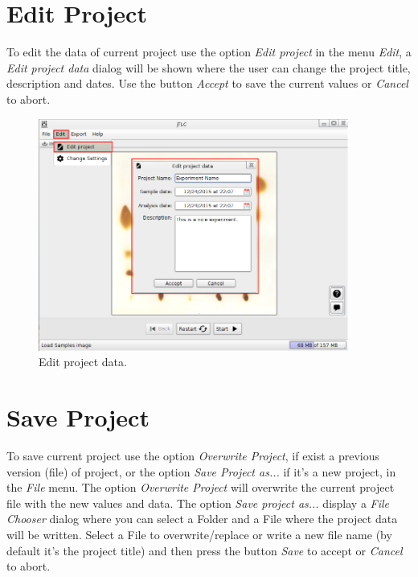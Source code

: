 \section{Edit Project}
To edit the data of current project use the option \emph{Edit project} in the menu \emph{Edit}, a \emph{Edit project data} dialog will be shown where the user can change the project title, description and dates. Use the button \emph{Accept} to save the current values or \emph{Cancel} to abort.
\begin{figure}[H]
	\vspace{0cm}
	\centering
	\includegraphics[width=385px]{imagenes/edit_project}
	\centering
	\vspace{-0.4cm}
	\caption{Edit project data.}
	\label{fig:edit_project}
	\vspace{-0.25cm}
\end{figure}
\newpage

\section{Save Project}
To save current project use the option \emph{Overwrite Project}, if exist a previous version (file) of project, or the option \emph{Save Project as...} if it's a new project, in the \emph{File} menu. The option \emph{Overwrite Project} will overwrite the current project file with the new values and data. The option \emph{Save project as...} display a \emph{File Chooser} dialog where you can select a Folder and a File where the project data will be written. Select a File to overwrite/replace or write a new file name (by default it's the project title) and then press the button \emph{Save} to accept or \emph{Cancel} to abort.

